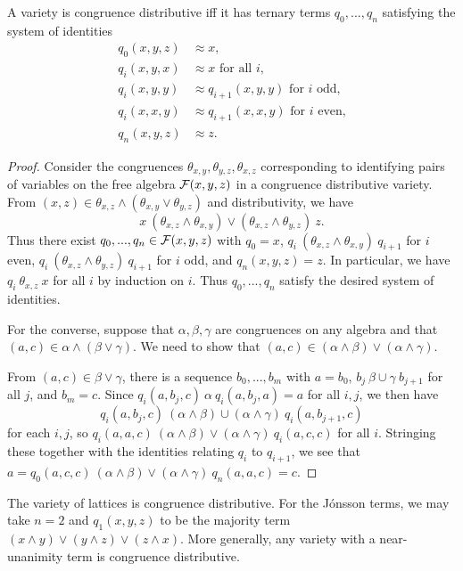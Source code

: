 \documentclass[letterpaper,11pt]{article}
\begin{document}
\begin{thm}\label{jonsson-terms} A variety is congruence distributive iff it has ternary terms $q_0, ..., q_n$ satisfying the system of identities
\begin{align*}
q_0(x,y,z) &\approx x,\\
q_i(x,y,x) &\approx x\text{ for all }i,\\
q_i(x,y,y) &\approx q_{i+1}(x,y,y)\text{ for }i\text{ odd,}\\
q_i(x,x,y) &\approx q_{i+1}(x,x,y)\text{ for }i\text{ even,}\\
q_n(x,y,z) &\approx z.
\end{align*}
\end{thm}
\begin{proof} Consider the congruences $\theta_{x,y}, \theta_{y,z}, \theta_{x,z}$ corresponding to identifying pairs of variables on the free algebra $\mathcal{F}(x,y,z)$ in a congruence distributive variety. From $(x,z) \in \theta_{x,z}\wedge (\theta_{x,y} \vee \theta_{y,z})$ and distributivity, we have
\[
x\ (\theta_{x,z} \wedge \theta_{x,y}) \vee (\theta_{x,z} \wedge \theta_{y,z})\ z.
\]
Thus there exist $q_0, ..., q_n \in \mathcal{F}(x,y,z)$ with $q_0 = x$, $q_i\ (\theta_{x,z} \wedge \theta_{x,y})\ q_{i+1}$ for $i$ even, $q_i\ (\theta_{x,z} \wedge \theta_{y,z})\ q_{i+1}$ for $i$ odd, and $q_n(x,y,z) = z$. In particular, we have $q_i\ \theta_{x,z}\ x$ for all $i$ by induction on $i$. Thus $q_0, ..., q_n$ satisfy the desired system of identities.

For the converse, suppose that $\alpha,\beta,\gamma$ are congruences on any algebra and that $(a,c) \in \alpha \wedge (\beta \vee \gamma)$. We need to show that $(a,c) \in (\alpha \wedge \beta) \vee (\alpha \wedge \gamma)$.

From $(a,c) \in \beta\vee\gamma$, there is a sequence $b_0, ..., b_m$ with $a = b_0$, $b_j\ \beta\cup\gamma\ b_{j+1}$ for all $j$, and $b_m = c$. Since $q_i(a,b_j,c)\ \alpha\ q_i(a,b_j,a) = a$ for all $i,j$, we then have
\[
q_i(a,b_j,c)\ (\alpha \wedge \beta) \cup (\alpha \wedge \gamma)\ q_i(a,b_{j+1},c)
\]
for each $i,j$, so $q_i(a,a,c)\ (\alpha \wedge \beta) \vee (\alpha \wedge \gamma)\ q_i(a,c,c)$ for all $i$. Stringing these together with the identities relating $q_i$ to $q_{i+1}$, we see that $a = q_0(a,c,c)\ (\alpha \wedge \beta) \vee (\alpha \wedge \gamma)\ q_n(a,a,c) = c$.
\end{proof}

\begin{ex} The variety of lattices is congruence distributive. For the J\'onsson terms, we may take $n = 2$ and $q_1(x,y,z)$ to be the majority term $(x\wedge y)\vee (y\wedge z) \vee (z \wedge x)$. More generally, any variety with a near-unanimity term is congruence distributive.
\end{ex}
\end{document}
